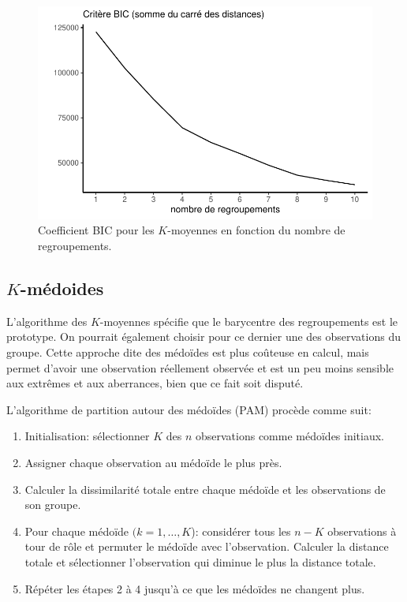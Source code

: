\documentclass[
  11pt,
  letterpaper,
]{scrbook}
\providecommand{\tightlist}{%
  \setlength{\itemsep}{0pt}\setlength{\parskip}{0pt}}\usepackage{longtable,booktabs,array}
\theoremstyle{definition}
\theoremstyle{remark}
\begin{document}
\begin{figure}[ht!]

{\centering \includegraphics{./03-regroupements_files/figure-pdf/fig-bickmoy-1.pdf}

}

\caption{\label{fig-bickmoy}Coefficient BIC pour les \(K\)-moyennes en
fonction du nombre de regroupements.}

\end{figure}

\hypertarget{k-muxe9doides}{%
\subsection{\texorpdfstring{\(K\)-médoides}{K-médoides}}\label{k-muxe9doides}}

L'algorithme des \(K\)-moyennes spécifie que le barycentre des
regroupements est le prototype. On pourrait également choisir pour ce
dernier une des observations du groupe. Cette approche dite des médoïdes
est plus coûteuse en calcul, mais permet d'avoir une observation
réellement observée et est un peu moins sensible aux extrêmes et aux
aberrances, bien que ce fait soit disputé.

L'algorithme de partition autour des médoïdes (PAM) procède comme suit:

\begin{enumerate}
\def\labelenumi{\arabic{enumi}.}
\tightlist
\item
  Initialisation: sélectionner \(K\) des \(n\) observations comme
  médoïdes initiaux.
\item
  Assigner chaque observation au médoïde le plus près.
\item
  Calculer la dissimilarité totale entre chaque médoïde et les
  observations de son groupe.
\item
  Pour chaque médoïde \((k=1, \ldots, K\)): considérer tous les \(n-K\)
  observations à tour de rôle et permuter le médoïde avec l'observation.
  Calculer la distance totale et sélectionner l'observation qui diminue
  le plus la distance totale.
\item
  Répéter les étapes 2 à 4 jusqu'à ce que les médoïdes ne changent plus.
\end{enumerate}
\end{document}
